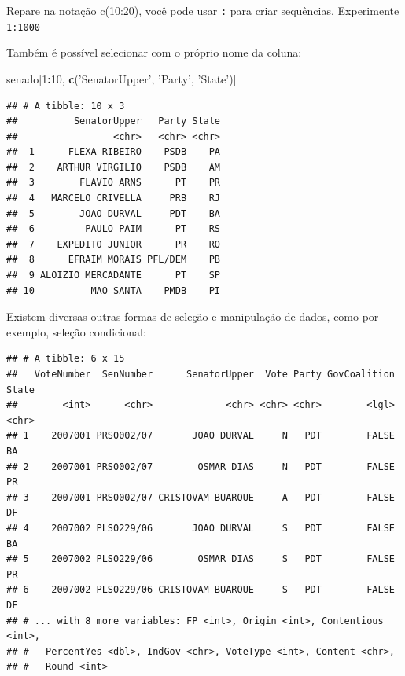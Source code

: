 \documentclass[]{book}
\newenvironment{Shaded}{\begin{snugshade}}{\end{snugshade}}
\newcommand{\KeywordTok}[1]{\textcolor[rgb]{0.13,0.29,0.53}{\textbf{#1}}}
\newcommand{\DecValTok}[1]{\textcolor[rgb]{0.00,0.00,0.81}{#1}}
\newcommand{\StringTok}[1]{\textcolor[rgb]{0.31,0.60,0.02}{#1}}
\newcommand{\OperatorTok}[1]{\textcolor[rgb]{0.81,0.36,0.00}{\textbf{#1}}}
\newcommand{\NormalTok}[1]{#1}
\begin{document}
Repare na notação c(10:20), você pode usar \texttt{:} para criar
sequências. Experimente \texttt{1:1000}

Também é possível selecionar com o próprio nome da coluna:

\begin{Shaded}
\begin{Highlighting}[]
\NormalTok{senado[}\DecValTok{1}\OperatorTok{:}\DecValTok{10}\NormalTok{, }\KeywordTok{c}\NormalTok{(}\StringTok{'SenatorUpper'}\NormalTok{, }\StringTok{'Party'}\NormalTok{, }\StringTok{'State'}\NormalTok{)]}
\end{Highlighting}
\end{Shaded}

\begin{verbatim}
## # A tibble: 10 x 3
##          SenatorUpper   Party State
##                 <chr>   <chr> <chr>
##  1      FLEXA RIBEIRO    PSDB    PA
##  2    ARTHUR VIRGILIO    PSDB    AM
##  3        FLAVIO ARNS      PT    PR
##  4   MARCELO CRIVELLA     PRB    RJ
##  5        JOAO DURVAL     PDT    BA
##  6         PAULO PAIM      PT    RS
##  7    EXPEDITO JUNIOR      PR    RO
##  8      EFRAIM MORAIS PFL/DEM    PB
##  9 ALOIZIO MERCADANTE      PT    SP
## 10          MAO SANTA    PMDB    PI
\end{verbatim}

Existem diversas outras formas de seleção e manipulação de dados, como
por exemplo, seleção condicional:

\begin{Shaded}
\end{Shaded}

\begin{verbatim}
## # A tibble: 6 x 15
##   VoteNumber  SenNumber      SenatorUpper  Vote Party GovCoalition State
##        <int>      <chr>             <chr> <chr> <chr>        <lgl> <chr>
## 1    2007001 PRS0002/07       JOAO DURVAL     N   PDT        FALSE    BA
## 2    2007001 PRS0002/07        OSMAR DIAS     N   PDT        FALSE    PR
## 3    2007001 PRS0002/07 CRISTOVAM BUARQUE     A   PDT        FALSE    DF
## 4    2007002 PLS0229/06       JOAO DURVAL     S   PDT        FALSE    BA
## 5    2007002 PLS0229/06        OSMAR DIAS     S   PDT        FALSE    PR
## 6    2007002 PLS0229/06 CRISTOVAM BUARQUE     S   PDT        FALSE    DF
## # ... with 8 more variables: FP <int>, Origin <int>, Contentious <int>,
## #   PercentYes <dbl>, IndGov <chr>, VoteType <int>, Content <chr>,
## #   Round <int>
\end{verbatim}
\end{document}
